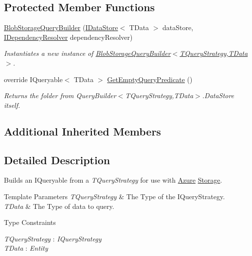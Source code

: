 \subsection*{Protected Member Functions}
\begin{DoxyCompactItemize}
\item 
\hyperlink{classCqrs_1_1Azure_1_1BlobStorage_1_1Repositories_1_1Queries_1_1BlobStorageQueryBuilder_ae6519f289d2b7be9d322dfa7171dea8b_ae6519f289d2b7be9d322dfa7171dea8b}{Blob\+Storage\+Query\+Builder} (\hyperlink{interfaceCqrs_1_1DataStores_1_1IDataStore}{I\+Data\+Store}$<$ T\+Data $>$ data\+Store, \hyperlink{interfaceCqrs_1_1Configuration_1_1IDependencyResolver}{I\+Dependency\+Resolver} dependency\+Resolver)
\begin{DoxyCompactList}\small\item\em Instantiates a new instance of \hyperlink{classCqrs_1_1Azure_1_1BlobStorage_1_1Repositories_1_1Queries_1_1BlobStorageQueryBuilder_ae6519f289d2b7be9d322dfa7171dea8b_ae6519f289d2b7be9d322dfa7171dea8b}{Blob\+Storage\+Query\+Builder$<$\+T\+Query\+Strategy,\+T\+Data$>$}. \end{DoxyCompactList}\item 
override I\+Queryable$<$ T\+Data $>$ \hyperlink{classCqrs_1_1Azure_1_1BlobStorage_1_1Repositories_1_1Queries_1_1BlobStorageQueryBuilder_a5987844de032c5473714dafcee7f4ae1_a5987844de032c5473714dafcee7f4ae1}{Get\+Empty\+Query\+Predicate} ()
\begin{DoxyCompactList}\small\item\em Returns the folder from Query\+Builder$<$\+T\+Query\+Strategy,\+T\+Data$>$.\+Data\+Store itself. \end{DoxyCompactList}\end{DoxyCompactItemize}
\subsection*{Additional Inherited Members}


\subsection{Detailed Description}
Builds an I\+Queryable from a {\itshape T\+Query\+Strategy}  for use with \hyperlink{namespaceCqrs_1_1Azure}{Azure} \hyperlink{namespaceCqrs_1_1Azure_1_1Storage}{Storage}. 


\begin{DoxyTemplParams}{Template Parameters}
{\em T\+Query\+Strategy} & The Type of the I\+Query\+Strategy.\\
\hline
{\em T\+Data} & The Type of data to query.\\
\hline
\end{DoxyTemplParams}
\begin{Desc}
\item[Type Constraints]\begin{description}
\item[{\em T\+Query\+Strategy} : {\em I\+Query\+Strategy}]\item[{\em T\+Data} : {\em Entity}]\end{description}
\end{Desc}


